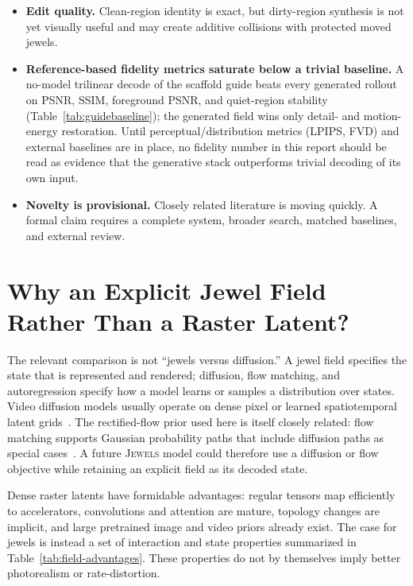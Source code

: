 \documentclass[10pt]{article}
\newcommand{\jewels}{\textsc{Jewels}}
\begin{document}
\begin{itemize}
  slower than a tile CUDA rasterizer. Current reconstruction is optimization-based, not amortized.
  \item \textbf{Edit quality.} Clean-region identity is exact, but dirty-region synthesis is not yet
  visually useful and may create additive collisions with protected moved jewels.
  \item \textbf{Reference-based fidelity metrics saturate below a trivial baseline.} A
  no-model trilinear decode of the scaffold guide beats every generated rollout on PSNR, SSIM,
  foreground PSNR, and quiet-region stability (Table~\ref{tab:guidebaseline}); the generated
  field wins only detail- and motion-energy restoration. Until perceptual/distribution metrics
  (LPIPS, FVD) and external baselines are in place, no fidelity number in this report should be
  read as evidence that the generative stack outperforms trivial decoding of its own input.
  \item \textbf{Novelty is provisional.} Closely related literature is moving quickly. A formal
  claim requires a complete system, broader search, matched baselines, and external review.
\end{itemize}

\section{Why an Explicit Jewel Field Rather Than a Raster Latent?}

The relevant comparison is not ``jewels versus diffusion.'' A jewel field specifies the state that
is represented and rendered; diffusion, flow matching, and autoregression specify how a model
learns or samples a distribution over states. Video diffusion models usually operate on dense
pixel or learned spatiotemporal latent grids~\cite{ho2022video,blattmann2023stablevideo}. The
rectified-flow prior used here is itself closely related: flow matching supports Gaussian
probability paths that include diffusion paths as special cases~\cite{lipman2023flow}. A future
\jewels{} model could therefore use a diffusion or flow objective while retaining an explicit field
as its decoded state.

Dense raster latents have formidable advantages: regular tensors map efficiently to accelerators,
convolutions and attention are mature, topology changes are implicit, and large pretrained image
and video priors already exist. The case for jewels is instead a set of interaction and state
properties summarized in Table~\ref{tab:field-advantages}. These properties do not by themselves
imply better photorealism or rate-distortion.
\end{document}
